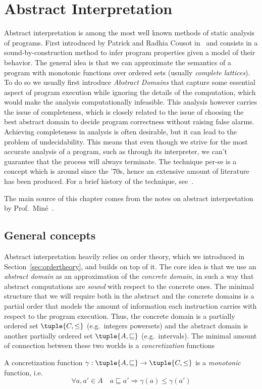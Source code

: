 \section{Abstract Interpretation}\label{sec:abstrint}

Abstract interpretation is among the most well known methods of static
analysis of programs. First introduced by Patrick and Radhia Cousot
in~\cite{patrickradhia:one, patrickradhia:two} and consists in a
sound-by-construction method to infer program properties given a model
of their behavior. The general idea is that we can approximate the
semantics of a program with monotonic functions over ordered sets
(usually \emph{complete lattices}). To do so we usually first
introduce \emph{Abstract Domains} that capture some essential aspect
of program execution while ignoring the details of the computation,
which would make the analysis computationally infeasible.  This
analysis however carries the issue of completeness, which is closely
related to the issue of choosing the best abstract domain to decide
program correctness without raising false alarms. Achieving
completeness in analysis is often desirable, but it can lead to the
problem of undecidability. This means that even though we strive for
the most accurate analysis of a program, such as through its
interpreter, we can't guarantee that the process will always
terminate.  The technique per-se is a concept which is around since
the '70s, hence an extensive amount of literature has been
produced. For a brief history of the technique,
see~\cite{ranzato:history}.

The main source of this chapter comes from the notes on abstract
interpretation by Prof.\ Miné~\cite{mine:course}.

\subsection{General concepts}\label{subsec:abstrgeneral}

Abstract interpretation heavily relies on order theory, which we
introduced in Section~\ref{sec:ordertheory}, and builds on top of
it. The core idea is that we use an \emph{abstract domain} as an
approximation of the \emph{concrete domain}, in such a way that
abstract computations are \emph{sound} with respect to the concrete
ones. The minimal structure that we will require both in the abstract
and the concrete domains is a partial order that models the amount of
information each instruction carries with respect to the program
execution. Thus, the concrete domain is a partially ordered set
\(\tuple{C, \leq}\) (e.g.\ integers powersets) and the abstract domain
is another partially ordered set \(\tuple{A, \sqsubseteq}\) (e.g.\
intervals). The minimal amount of connection between these two worlds
is a \emph{concretization} functions
\begin{definition}[Concretization]
  A concretization function
  \(\gamma : \tuple{A , \sqsubseteq} \to \tuple{C, \leq}\) is a
  \emph{monotonic} function, i.e.
  \begin{equation*}
    \forall a,a' \in A \quad a \sqsubseteq a' \Rightarrow \gamma(a) \leq \gamma(a')
  \end{equation*}
\end{definition}

